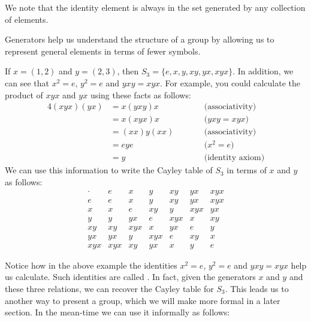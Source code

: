 We note that the identity element is always in the set generated by any
collection of elements.

Generators help us understand the structure of a group by allowing us to
represent general elements in terms of fewer symbols.

\begin{example}
  If $x = (1,2)$ and $y = (2,3)$, then $S_{3} = \{e, x, y, xy, yx, xyx\}$.
  In addition, we can see that $x^{2} = e$, $y^{2} = e$ and $yxy = xyx$.
  For example, you could calculate the product of $xyx$ and $yx$ using these
  facts as follows:
  \begin{alignat*}{4}
    (xyx)(yx) &= x(yxy)x &\qquad& \text{(associativity)}\\
              &= x(xyx)x && \text{($yxy = xyx$)}\\
              &= (xx)y(xx) && \text{(associativity)}\\
              &= eye && \text{($x^{2} = e$)}\\
              &= y && \text{(identity axiom)}
  \end{alignat*}
  We can use this information to write the Cayley table of $S_{3}$ in terms
  of $x$ and $y$ as follows:
  \[
    \begin{array}{c|cccccc}
      \cdot & e &   x &   y &  xy &  yx & xyx \\
      \hline
        e &   e &   x &   y &  xy &  yx & xyx \\
        x &   x &   e &  xy &   y & xyx &  yx \\
        y &   y &  yx &   e & xyx &   x &  xy \\
       xy &  xy & xyx &   x &  yx &   e &   y \\
       yx &  yx &   y & xyx &   e &  xy &   x \\
      xyx & xyx &  xy &  yx &   x &   y &   e
    \end{array}
  \]
\end{example}

Notice how in the above example the identities $x^{2} = e$, $y^{2} = e$ and
$yxy = xyx$ help us calculate.  Such identities are called
.  In fact, given the generators $x$ and $y$
and these three relations, we can recover the Cayley table for $S_{3}$.
This leads us to another way to present a group, which we will make more
formal in a later section.  In the mean-time we can use it informally as
follows:

